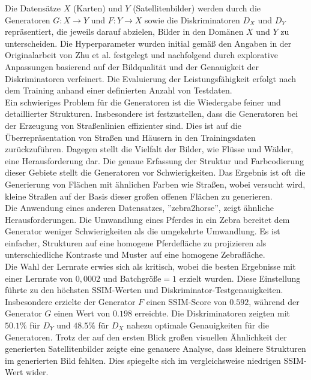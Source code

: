 Die Datensätze $X$ (Karten) und $Y$ (Satellitenbilder) werden durch die Generatoren $G: X\rightarrow Y$ und $F: Y\rightarrow X$ sowie die Diskriminatoren $D_X$ und $D_Y$ repräsentiert, die jeweils darauf abzielen, Bilder in den Domänen $X$ und $Y$ zu unterscheiden. Die Hyperparameter wurden initial gemäß den Angaben in der Originalarbeit von Zhu et al. \cite{Zhu.2017} festgelegt und nachfolgend durch explorative Anpassungen basierend auf der Bildqualität und der Genauigkeit der Diskriminatoren verfeinert. Die Evaluierung der Leistungsfähigkeit erfolgt nach dem Training anhand einer definierten Anzahl von Testdaten.
\\\newline
Ein schwieriges Problem für die Generatoren ist die Wiedergabe feiner und detaillierter Strukturen. Insbesondere ist festzustellen, dass die Generatoren bei der Erzeugung von Straßenlinien effizienter sind. Dies ist auf die Überrepräsentation von Straßen und Häusern in den Trainingsdaten zurückzuführen. Dagegen stellt die Vielfalt der Bilder, wie Flüsse und Wälder, eine Herausforderung dar. Die genaue Erfassung der Struktur und Farbcodierung dieser Gebiete stellt die Generatoren vor Schwierigkeiten. Das Ergebnis ist oft die Generierung von Flächen mit ähnlichen Farben wie Straßen, wobei versucht wird, kleine Straßen auf der Basis dieser großen offenen Flächen zu generieren.
\\
Die Anwendung eines anderen Datensatzes, ''zebra2horse'', zeigt ähnliche Herausforderungen. Die Umwandlung eines Pferdes in ein Zebra bereitet dem Generator weniger Schwierigkeiten als die umgekehrte Umwandlung. Es ist einfacher, Strukturen auf eine homogene Pferdefläche zu projizieren als unterschiedliche Kontraste und Muster auf eine homogene Zebrafläche.
\\\newline
Die Wahl der Lernrate erwies sich als kritisch, wobei die besten Ergebnisse mit einer Lernrate von $0,0002$ und Batchgröße$=1$ erzielt wurden. Diese Einstellung führte zu den höchsten SSIM-Werten und Diskriminator-Testgenauigkeiten. Insbesondere erzielte der Generator $F$ einen SSIM-Score von $0.592$, während der Generator $G$ einen Wert von $0.198$ erreichte. Die Diskriminatoren zeigten mit $50.1\%$ für $D_Y$ und $48.5\%$ für $D_X$ nahezu optimale Genauigkeiten für die Generatoren. Trotz der auf den ersten Blick großen visuellen Ähnlichkeit der generierten Satellitenbilder zeigte eine genauere Analyse, dass kleinere Strukturen im generierten Bild fehlten. Dies spiegelte sich im vergleichsweise niedrigen SSIM-Wert wider.
